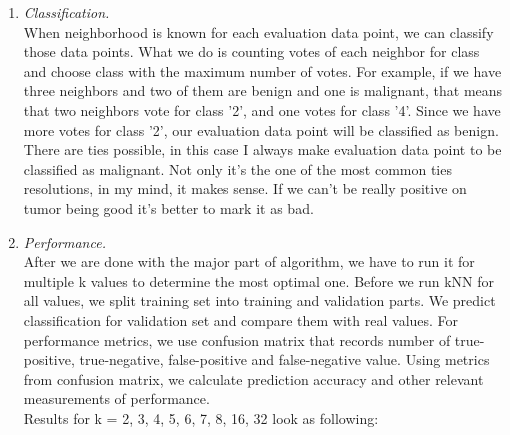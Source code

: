 \documentclass[12pt, letterpaper]{article}
\begin{document}
\begin{enumerate}[label=\Roman*.]
\begin{enumerate}[label=\arabic*.]
	\item {\it Classification. }\\
	When neighborhood is known for each  evaluation data point, we can classify those data points. What we do is counting votes of each neighbor for class and choose class with the maximum number of votes. For example, if we have three neighbors and two of them are benign and one is malignant, that means that two neighbors vote for class '2', and one votes for class '4'. Since we have more votes for class '2', our evaluation data point will be classified as benign. There are ties possible, in this case I always make evaluation data point to be classified as malignant. Not only it's the one of the most common ties resolutions, in my mind, it makes sense. If we can't be really positive on tumor being good it's better to mark it as bad. \\
	
	\item {\it Performance. }\\
	After we are done with the major part of algorithm, we have to run it for multiple k values to determine the most optimal one. Before we run kNN for all values, we split training set into training and validation parts. We predict classification for validation set and compare them with real values. For performance metrics, we use confusion matrix that records number of true-positive, true-negative, false-positive and false-negative value. Using metrics from confusion matrix, we calculate prediction accuracy and other relevant measurements of performance. \\
	
	Results for k = 2, 3, 4, 5, 6, 7, 8, 16, 32 look as following: \\
	

\end{enumerate}
\end{enumerate}
\end{document}
